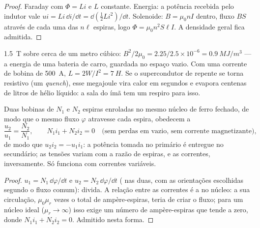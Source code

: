 \begin{proof}
Faraday com $\Phi = Li$ e $L$ constante. Energia: a potência recebida pelo
indutor vale $ui = Li\,\dd i/\dd t = \dd(\tfrac12Li^2)/\dd t$. Solenoide:
$B = \mu_0nI$ dentro, fluxo $BS$ através de cada uma das $n\ell$ espiras, logo $\Phi =
\mu_0n^2S\ell I$. A densidade geral fica admitida.
\end{proof}

\begin{example}\label{ex:b1:induction:mri}
\qty{1.5}{T} sobre cerca de um metro cúbico: $B^2/2\mu_0 = 2.25/2.5 \times 10^{-6} =
\qty{0.9}{MJ/m^3}$ --- a energia de uma bateria de carro, guardada no espaço vazio.
Com uma corrente de bobina de \qty{500}{A}, $L = 2W/I^2 = \qty{7}{H}$. Se o
supercondutor de repente se torna resistivo (um \emph{quench}), esse megajoule
vira calor em segundos e evapora centenas de litros de hélio
líquido: a sala do ímã tem um respiro para isso.
\end{example}

\begin{proposition}\label{prop:b1:induction:transformer}
Duas bobinas de $N_1$ e $N_2$ espiras enroladas no mesmo núcleo de ferro fechado,
de modo que o mesmo fluxo $\varphi$ atravesse cada espira, obedecem a
\[
\frac{u_2}{u_1} = \frac{N_2}{N_1} , \qquad N_1i_1 + N_2i_2 = 0 \quad\text{(sem perdas em vazio, sem corrente magnetizante)},
\]
de modo que $u_2i_2 = -u_1i_1$: a potência tomada no primário é entregue
no secundário; as tensões variam com a razão de espiras, e as correntes,
inversamente. Só funciona com correntes variáveis.
\end{proposition}

\begin{proof}
$u_1 = N_1\,\dd\varphi/\dd t$ e $u_2 = N_2\,\dd\varphi/\dd t$ (
nas duas, com as orientações escolhidas segundo o fluxo comum): divida.
A relação entre as correntes é a  no núcleo: a sua circulação,
$\mu_0\mu_r$ vezes o total de ampère-espiras, teria de criar o
fluxo; para um núcleo ideal ($\mu_r \to \infty$) isso exige um número de
ampère-espiras que tende a zero, donde $N_1i_1 + N_2i_2 = 0$. Admitido nesta forma.
\end{proof}

